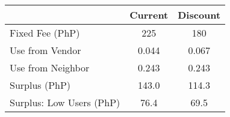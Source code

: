 \begin{tabular}{lcc}
& Current & Discount \\
\hline
Fixed Fee (PhP) &225&180\\
Use from Vendor & 0.044 & 0.067 \\
Use from Neighbor & 0.243 &0.243 \\
 Surplus  (PhP) &143.0&114.3 \\
 Surplus: Low Users (PhP)  &76.4&69.5 \\
\hline
\end{tabular}
